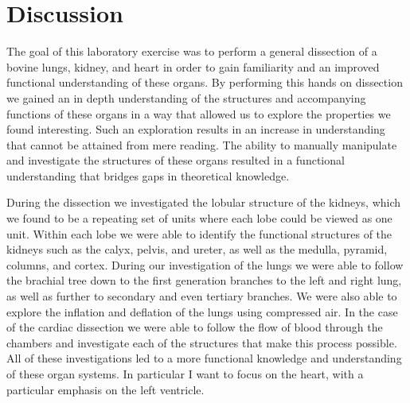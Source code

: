 \documentclass[12pt]{article}
\begin{document}
\section{Discussion}
\par{}
The goal of this laboratory exercise was to perform a general dissection of a bovine lungs, kidney, and heart in order to gain familiarity and an improved functional understanding of these organs. By performing this hands on dissection we gained an in depth understanding of the structures and accompanying functions of these organs in a way that allowed us to explore the properties we found interesting. Such an exploration results in an increase in understanding that cannot be attained from mere reading. The ability to manually manipulate and investigate the structures of these organs resulted in a functional understanding that bridges gaps in theoretical knowledge.
\par{}
During the dissection we investigated the lobular structure of the kidneys, which we found to be a repeating set of units where each lobe could be viewed as one unit. Within each lobe we were able to identify the functional structures of the kidneys such as the calyx, pelvis, and ureter, as well as the medulla, pyramid, columns, and cortex. During our investigation of the lungs we were able to follow the brachial tree down to the first generation branches to the left and right lung, as well as further to secondary and even tertiary branches. We were also able to explore the inflation and deflation of the lungs using compressed air. In the case of the cardiac dissection we were able to follow the flow of blood through the chambers and investigate each of the structures that make this process possible. All of these investigations led to a more functional knowledge and understanding of these organ systems. In particular I want to focus on the heart, with a particular emphasis on the left ventricle.
\par{}
\end{document}
